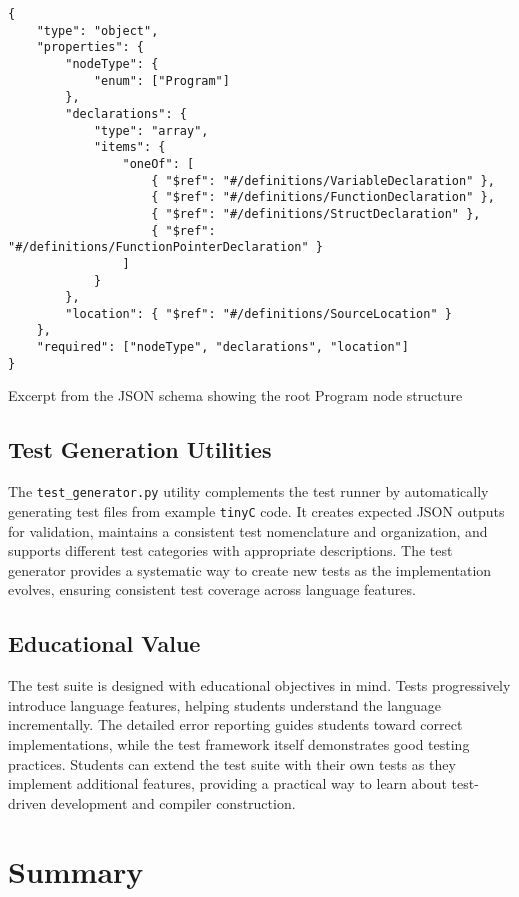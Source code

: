 \begin{listing}[ht]
\begin{verbatim}
{
    "type": "object",
    "properties": {
        "nodeType": {
            "enum": ["Program"]
        },
        "declarations": {
            "type": "array",
            "items": {
                "oneOf": [
                    { "$ref": "#/definitions/VariableDeclaration" },
                    { "$ref": "#/definitions/FunctionDeclaration" },
                    { "$ref": "#/definitions/StructDeclaration" },
                    { "$ref": "#/definitions/FunctionPointerDeclaration" }
                ]
            }
        },
        "location": { "$ref": "#/definitions/SourceLocation" }
    },
    "required": ["nodeType", "declarations", "location"]
}
\end{verbatim}
\caption{Excerpt from the JSON schema showing the root Program node structure}
\label{code:json-schema-root}
\end{listing}

\subsection{Test Generation Utilities}
The \texttt{test\_generator.py} utility complements the test runner by automatically generating test files from example \texttt{tinyC} code. It creates expected JSON outputs for validation, maintains a consistent test nomenclature and organization, and supports different test categories with appropriate descriptions. The test generator provides a systematic way to create new tests as the implementation evolves, ensuring consistent test coverage across language features.

\subsection{Educational Value}
The test suite is designed with educational objectives in mind. Tests progressively introduce language features, helping students understand the language incrementally. The detailed error reporting guides students toward correct implementations, while the test framework itself demonstrates good testing practices. Students can extend the test suite with their own tests as they implement additional features, providing a practical way to learn about test-driven development and compiler construction.




\section{Summary}

